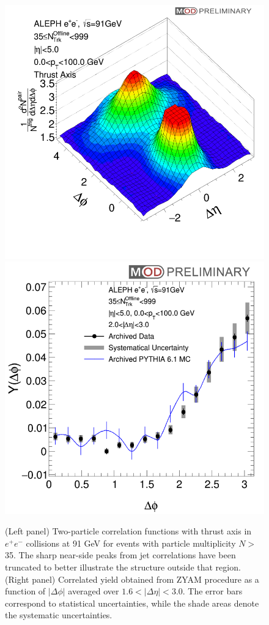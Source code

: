 \documentclass[aps,prl,twocolumn,showpacs,superscriptaddress,groupedaddress]{revtex4}  %
\begin{document}
\begin{figure}[!htb]
\begin{center}
\includegraphics[width=.29\textwidth]{plots/thrust/thrustAxisAnalysis.png}
\includegraphics[width=.29\textwidth]{plots/thrust/thrustAxisAnalysisProjection.png}
\caption{(Left panel) Two-particle correlation functions with thrust axis in $e^{+}e^{-}$ collisions at 91 GeV for events with particle multiplicity $N>$ 35. The sharp near-side peaks from jet correlations have been truncated to better illustrate the structure outside that region. (Right panel) Correlated yield obtained from ZYAM procedure as a function of $|\Delta\phi|$ averaged over $1.6<|\Delta\eta|<3.0$. The error bars correspond to statistical uncertainties, while the shade areas denote the systematic uncertainties.}
\label{fig:figure2} 
\end{center}
\end{figure}
\end{document}

